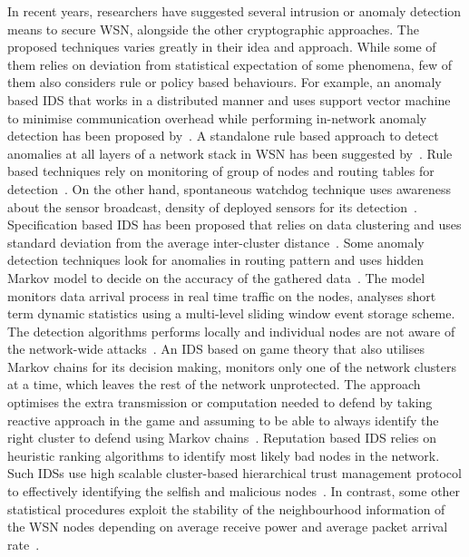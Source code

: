 \documentclass[conference,final]{IEEEtran}
\newcommand{\notedme}[1]{\raisebox{0pt}[0pt][0pt]{\pdfcomment[open=true,color=blue]{#1}}}
\begin{document}
In recent years, researchers have suggested several intrusion or anomaly detection means to secure WSN, alongside the other cryptographic approaches.
The proposed techniques varies greatly in their idea and approach.
While some of them relies on deviation from statistical expectation of some phenomena, few of them also considers rule or policy based behaviours.
For example, an anomaly based IDS that works in a distributed manner and uses support vector machine to minimise communication overhead while performing in-network anomaly detection has been proposed by~\cite{ISI:000257882502160}.
A standalone rule based approach to detect anomalies at all layers of a network stack in WSN has been suggested by~\cite{1515559}.
Rule based  techniques rely on monitoring of group of nodes and routing tables for detection~\cite{ISI:000298891500099, Chen:2009:NMI:1516241.1516282, 1424814, Strikos_afull}.
On the other hand, spontaneous watchdog technique uses awareness about the sensor broadcast, density of deployed sensors for its detection~\cite{1593102}.
Specification based  IDS has been proposed that relies on data clustering and uses standard deviation from the average inter-cluster distance~\cite{Chen:2009:NMI:1516241.1516282, 4085803}.
Some anomaly  detection techniques look for anomalies in routing pattern and uses  hidden Markov model to decide on the accuracy of the gathered data~\cite{1290173, 4024996}.%
The model monitors data arrival process in real time traffic on the nodes, analyses short term dynamic statistics using a multi-level sliding window event storage scheme. %
The detection algorithms performs locally and individual nodes are not aware of the network-wide attacks~\cite{1515559}.
An IDS based on game theory that also utilises Markov chains for its decision making, monitors only one of the network clusters at a time, which leaves the rest of the network unprotected.
The approach optimises the extra transmission or computation needed to defend by taking reactive approach in the game and assuming to be able to always identify the right cluster to defend using Markov chains~\cite{1347798, Das07preventingdos, Reddy:2009:GTA:1607720.1607944}.
Reputation based IDS relies on heuristic ranking algorithms to identify most likely bad nodes in the network.
Such IDSs use high scalable cluster-based hierarchical trust management protocol to effectively identifying the selfish and malicious nodes~\cite{6174485}.
In contrast, some other statistical procedures exploit the stability of the neighbourhood information of the WSN nodes depending on average receive power and average packet arrival rate~\cite{1512911}.
\end{document}
